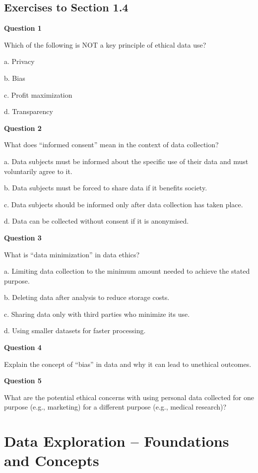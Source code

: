 \documentclass[
]{book}
\begin{document}
\subsection{Exercises to Section 1.4}\label{exercises-to-section-1.4}

\textbf{Question 1}

Which of the following is NOT a key principle of ethical data use?

a. Privacy

b. Bias

c. Profit maximization

d. Transparency

\textbf{Question 2}

What does ``informed consent'' mean in the context of data collection?

a. Data subjects must be informed about the specific use of their data and must voluntarily agree to it.

b. Data subjects must be forced to share data if it benefits society.

c. Data subjects should be informed only after data collection has taken place.

d. Data can be collected without consent if it is anonymised.

\textbf{Question 3}

What is ``data minimization'' in data ethics?

a. Limiting data collection to the minimum amount needed to achieve the stated purpose.

b. Deleting data after analysis to reduce storage costs.

c. Sharing data only with third parties who minimize its use.

d. Using smaller datasets for faster processing.

\textbf{Question 4}

Explain the concept of ``bias'' in data and why it can lead to unethical outcomes.

\textbf{Question 5}

What are the potential ethical concerns with using personal data collected for one purpose (e.g., marketing) for a different purpose (e.g., medical research)?

\section{Data Exploration -- Foundations and Concepts}\label{sec1-5}
\end{document}
